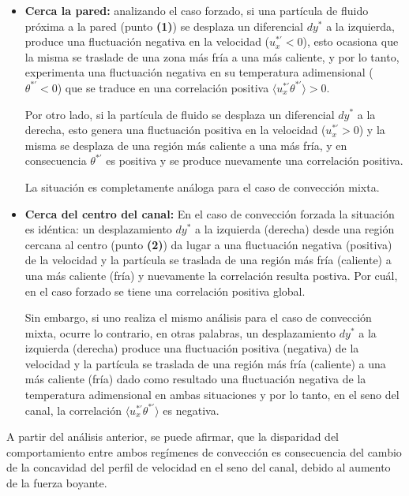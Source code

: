 \begin{itemize}

\item \textbf{Cerca la pared:} analizando el caso forzado, si una partícula de fluido próxima a la pared (punto \textbf{(1)}) se desplaza un diferencial $dy^*$ a la izquierda, produce una fluctuación negativa en la velocidad ($u^{* \prime}_x <0$), esto ocasiona que la misma se traslade de una zona más fría a una más caliente, y por lo tanto, experimenta una fluctuación negativa en su temperatura adimensional ($\theta^{* \prime}<0$) que se traduce en una correlación positiva $\langle u_x^{\ast \prime } \theta^{\ast \prime } \rangle > 0$. 

Por otro lado, si la partícula de fluido se desplaza un diferencial $dy^*$ a la derecha, esto genera una fluctuación positiva en la velocidad ($u^{* \prime}_x >0$) y la misma se desplaza de una región más caliente a una más fría, y en consecuencia $\theta^{* \prime}$ es positiva y se produce nuevamente una correlación positiva.

La situación es completamente análoga para el caso de convección mixta.

\item \textbf{Cerca del centro del canal:} En el caso de convección forzada la situación es idéntica: un desplazamiento $dy^*$ a la izquierda (derecha) desde una región cercana al centro (punto \textbf{(2)}) da lugar a una fluctuación negativa (positiva) de la velocidad y la partícula se traslada de una región más fría (caliente) a una más caliente (fría) y nuevamente la correlación resulta postiva. Por cuál, en el caso forzado se tiene una correlación positiva global. 

Sin embargo, si uno realiza el mismo análisis para el caso de convección mixta, ocurre lo contrario, en otras palabras, un desplazamiento $dy^*$ a la izquierda (derecha) produce una fluctuación positiva (negativa) de la velocidad y la partícula se traslada de una región más fría (caliente) a una más caliente (fría) dado como resultado una fluctuación negativa de la temperatura adimensional en ambas situaciones y por lo tanto, en el seno del canal, la correlación $\langle u_x^{\ast \prime } \theta^{\ast \prime } \rangle$ es negativa.
\end{itemize}  

A partir del análisis anterior, se puede afirmar, que la disparidad del comportamiento  entre ambos regímenes de convección es consecuencia del cambio de la concavidad del perfil de velocidad en el seno del canal, debido al aumento de la fuerza boyante.



